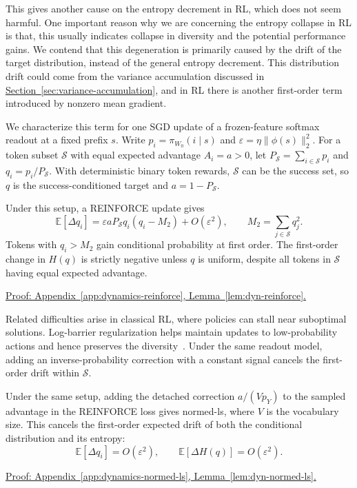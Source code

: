 This gives another cause on the entropy decrement in RL, which does not seem harmful. One important reason why we are concerning the entropy collapse in RL is that, this usually indicates collapse in diversity and the potential performance gains. We contend that this degeneration is primarily caused by the drift of the target distribution, instead of the general entropy decrement. This distribution drift could come from the variance accumulation discussed in \hyperref[sec:variance-accumulation]{Section~\ref*{sec:variance-accumulation}}, and in RL there is another first-order term introduced by nonzero mean gradient.

We characterize this term for one SGD update of a frozen-feature softmax readout at a fixed prefix $s$. Write $p_i=\pi_{W_0}(i\mid s)$ and $\varepsilon=\eta\|\phi(s)\|_2^2$. For a token subset $\mathcal S$ with equal expected advantage $A_i=a>0$, let $P_{\mathcal S}=\sum_{i\in\mathcal S}p_i$ and $q_i=p_i/P_{\mathcal S}$. With deterministic binary token rewards, $\mathcal S$ can be the success set, so $q$ is the success-conditioned target and $a=1-P_{\mathcal S}$.

\begin{lemma}
\label{lem:rl-conditional-drift}
Under this setup, a REINFORCE update gives
\begin{equation}
 \mathbb E[\Delta q_i]
 =\varepsilon aP_{\mathcal S}q_i(q_i-M_2)+O(\varepsilon^2),
 \qquad M_2=\sum_{j\in\mathcal S}q_j^2.
 \label{eq:rl-conditional-drift}
\end{equation}
Tokens with $q_i>M_2$ gain conditional probability at first order. The first-order change in $H(q)$ is strictly negative unless $q$ is uniform, despite all tokens in $\mathcal S$ having equal expected advantage.
\end{lemma}
\noindent\hyperref[app:dynamics-reinforce]{Proof: Appendix~\ref*{app:dynamics-reinforce}, Lemma~\ref*{lem:dyn-reinforce}.}

Related difficulties arise in classical RL, where policies can stall near suboptimal solutions. Log-barrier regularization helps maintain updates to low-probability actions and hence preserves the diversity~\citep{agarwal_theory_2020}. Under the same readout model, adding an inverse-probability correction with a constant signal cancels the first-order drift within $\mathcal S$.

\begin{lemma}
\label{lem:rl-drift-cancellation}
Under the same setup, adding the detached correction $a/(Vp_Y)$ to the sampled advantage in the REINFORCE loss gives normed-ls, where $V$ is the vocabulary size. This cancels the first-order expected drift of both the conditional distribution and its entropy:
\begin{equation}
 \mathbb E[\Delta q_i]=O(\varepsilon^2),
 \qquad \mathbb E[\Delta H(q)]=O(\varepsilon^2).
 \label{eq:rl-drift-cancellation}
\end{equation}
\end{lemma}
\noindent\hyperref[app:dynamics-normed-ls]{Proof: Appendix~\ref*{app:dynamics-normed-ls}, Lemma~\ref*{lem:dyn-normed-ls}.}

